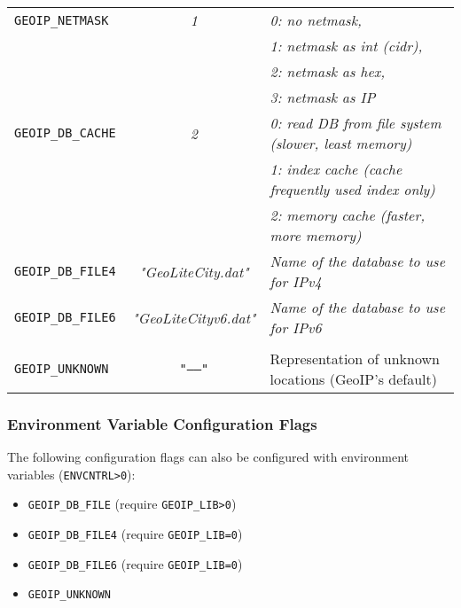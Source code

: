 \documentclass[documentation]{subfiles}
\begin{document}
\begin{longtable}{>{\tt}lcl}
    GEOIP\_NETMASK     & {\em 1}    & {\em 0: no netmask,}\\
                       &            & {\em 1: netmask as int (cidr),}\\
                       &            & {\em 2: netmask as hex,}\\
                       &            & {\em 3: netmask as IP}\\
    GEOIP\_DB\_CACHE   & {\em 2}    & {\em 0: read DB from file system (slower, least memory)}\\
                       &            & {\em 1: index cache (cache frequently used index only)}\\
                       &            & {\em 2: memory cache (faster, more memory)}\\
    GEOIP\_DB\_FILE4   & {\em\small "GeoLiteCity.dat"}
                                    & {\em Name of the database to use for IPv4}\\
    GEOIP\_DB\_FILE6   & {\em\small "GeoLiteCityv6.dat"}
                                    & {\em Name of the database to use for IPv6}\\
    \\
    GEOIP\_UNKNOWN     & {\tt\small "--{}--"}
                                    & Representation of unknown locations (GeoIP's default)\\
    \bottomrule
\end{longtable}

\subsubsection{Environment Variable Configuration Flags}
The following configuration flags can also be configured with environment variables ({\tt ENVCNTRL>0}):
\begin{itemize}
    \item {\tt GEOIP\_DB\_FILE} (require {\tt GEOIP\_LIB>0})
    \item {\tt GEOIP\_DB\_FILE4} (require {\tt GEOIP\_LIB=0})
    \item {\tt GEOIP\_DB\_FILE6} (require {\tt GEOIP\_LIB=0})
    \item {\tt GEOIP\_UNKNOWN}
\end{itemize}
\end{document}
